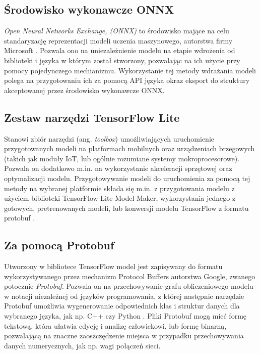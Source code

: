 
\subsection{Środowisko wykonawcze ONNX}

\textit{Open Neural Networks Exchange, (ONNX)} to środowisko mające na celu standaryzację reprezentacji modeli uczenia maszynowego, autorstwa firmy Microsoft \cite{deploy3}. Pozwala ono na uniezależnienie modelu na etapie wdrożenia od biblioteki i języka w którym został stworzony, pozwalając na ich użycie przy pomocy pojedynczego mechianizmu. Wykorzystanie tej metody wdrażania modeli polega na przygotowaniu ich za pomocą API języka okraz eksport do struktury akceptowanej przez środowisko wykonawcze ONNX.

\subsection{Zestaw narzędzi TensorFlow Lite}

Stanowi zbiór narzędzi (ang. \textit{toolbox}) umożliwiających uruchomienie przygotowanych modeli na platformach mobilnych oraz urządzeniach brzegowych (takich jak moduły IoT, lub ogólnie rozumiane systemy mokroprocesorowe). Pozwala on dodatkowo m.in. na wykorzystanie akceleracji sprzętowej oraz optymalizacji modelu. Przygotowywanie modeli do uruchomienia za pomocą tej metody na wybranej platformie składa się m.in. z przygotowania modelu z użyciem biblioteki TensorFlow Lite Model Maker, wykorzystania jednego z gotowych, pretrenowanych modeli, lub konwersji modelu TensorFlow z formatu protobuf \cite{tflite}.

\subsection{Za pomocą Protobuf}

Utworzony w bibliotece TensorFlow model jest zapisywany do formatu wykorzystywanego przez mechanizm Protocol Buffers autorstwa Google, zwanego potocznie \textit{Protobuf}. Pozwala on na przechowywanie grafu obliczeniowego modelu w notacji niezależnej od języków programowania, z której następnie narzędzie Protobuf umożliwia wygenerowanie odpowiednich klas i struktur danych dla wybranego języka, jak np. C++ czy Python \cite{protobuf2}. Pliki Protobuf mogą mieć formę tekstową, która ułatwia edycję i analizę człowiekowi, lub formę binarną, pozwalającą na znaczne zaoszczędzenie miejsca w przypadku przechowywania danych numerycznych, jak np. wagi połączeń sieci. 

